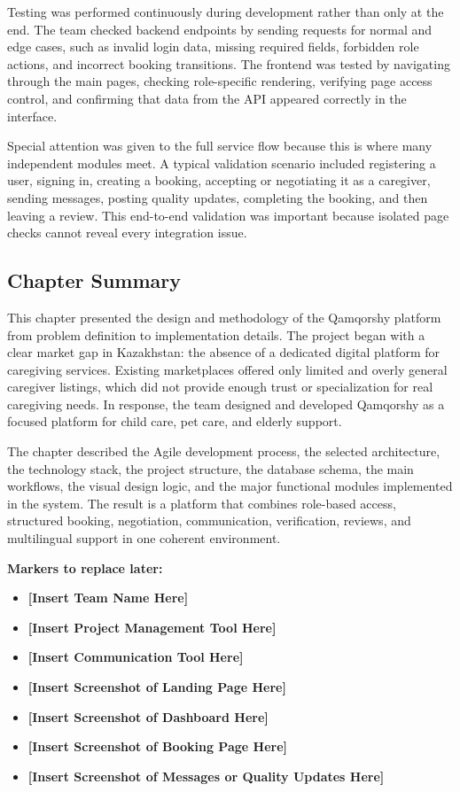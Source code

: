 \documentclass[12pt,a4paper]{article}
\begin{document}
Testing was performed continuously during development rather than only at the end. The team checked backend endpoints by sending requests for normal and edge cases, such as invalid login data, missing required fields, forbidden role actions, and incorrect booking transitions. The frontend was tested by navigating through the main pages, checking role-specific rendering, verifying page access control, and confirming that data from the API appeared correctly in the interface.

Special attention was given to the full service flow because this is where many independent modules meet. A typical validation scenario included registering a user, signing in, creating a booking, accepting or negotiating it as a caregiver, sending messages, posting quality updates, completing the booking, and then leaving a review. This end-to-end validation was important because isolated page checks cannot reveal every integration issue.

\subsection{Chapter Summary}

This chapter presented the design and methodology of the Qamqorshy platform from problem definition to implementation details. The project began with a clear market gap in Kazakhstan: the absence of a dedicated digital platform for caregiving services. Existing marketplaces offered only limited and overly general caregiver listings, which did not provide enough trust or specialization for real caregiving needs. In response, the team designed and developed Qamqorshy as a focused platform for child care, pet care, and elderly support.

The chapter described the Agile development process, the selected architecture, the technology stack, the project structure, the database schema, the main workflows, the visual design logic, and the major functional modules implemented in the system. The result is a platform that combines role-based access, structured booking, negotiation, communication, verification, reviews, and multilingual support in one coherent environment.

\bigskip
\noindent\textbf{Markers to replace later:}
\begin{itemize}[leftmargin=1.5cm]
    \item \textbf{[Insert Team Name Here]}
    \item \textbf{[Insert Project Management Tool Here]}
    \item \textbf{[Insert Communication Tool Here]}
    \item \textbf{[Insert Screenshot of Landing Page Here]}
    \item \textbf{[Insert Screenshot of Dashboard Here]}
    \item \textbf{[Insert Screenshot of Booking Page Here]}
    \item \textbf{[Insert Screenshot of Messages or Quality Updates Here]}
\end{itemize}
\end{document}
